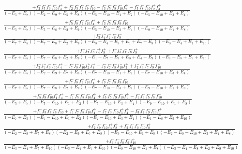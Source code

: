 \documentclass{article}
\begin{document}
\[\begin{array}{rcl}
\frac{+f_{2}^{-}f_{5}^{-}f_{9}^{-}f_{10}^{-}f_{4}^{+}+f_{2}^{-}f_{3}^{-}f_{5}^{-}f_{9}^{-}f_{10}^{-}-f_{3}^{-}f_{5}^{-}f_{8}^{-}f_{10}^{-}f_{2}^{+}-f_{5}^{-}f_{8}^{-}f_{10}^{-}f_{2}^{+}f_{4}^{+}}{(-E_{5}+E_{7})(-E_{2}-E_{9}+E_{5}+E_{8})(-E_{5}-E_{10}+E_{1}+E_{2})(-E_{5}-E_{10}+E_{3}+E_{4})}\\
\frac{+f_{5}^{-}f_{8}^{-}f_{9}^{-}f_{10}^{-}f_{4}^{+}+f_{3}^{-}f_{5}^{-}f_{8}^{-}f_{9}^{-}f_{10}^{-}}{(-E_{5}+E_{7})(-E_{5}-E_{8}+E_{2}+E_{9})(-E_{5}-E_{10}+E_{3}+E_{4})(-E_{9}-E_{10}+E_{1}+E_{8})}\\
\frac{+f_{3}^{-}f_{4}^{-}f_{7}^{-}f_{8}^{-}f_{9}^{-}}{(-E_{7}+E_{5})(-E_{7}-E_{8}+E_{2}+E_{9})(-E_{3}-E_{4}-E_{9}+E_{1}+E_{7}+E_{8})(-E_{3}-E_{4}+E_{7}+E_{10})}\\
\frac{+f_{1}^{-}f_{7}^{-}f_{8}^{-}f_{4}^{+}f_{9}^{+}+f_{1}^{-}f_{3}^{-}f_{7}^{-}f_{8}^{-}f_{9}^{+}}{(-E_{7}+E_{5})(-E_{7}-E_{8}+E_{2}+E_{9})(-E_{1}-E_{7}-E_{8}+E_{3}+E_{4}+E_{9})(-E_{1}-E_{8}+E_{9}+E_{10})}\\
\frac{+f_{2}^{-}f_{7}^{-}f_{9}^{-}f_{10}^{-}f_{4}^{+}-f_{7}^{-}f_{8}^{-}f_{10}^{-}f_{2}^{+}f_{4}^{+}-f_{3}^{-}f_{7}^{-}f_{8}^{-}f_{10}^{-}f_{2}^{+}+f_{2}^{-}f_{3}^{-}f_{7}^{-}f_{9}^{-}f_{10}^{-}}{(-E_{7}+E_{5})(-E_{2}-E_{9}+E_{7}+E_{8})(-E_{7}-E_{10}+E_{1}+E_{2})(-E_{7}-E_{10}+E_{3}+E_{4})}\\
\frac{+f_{7}^{-}f_{8}^{-}f_{9}^{-}f_{10}^{-}f_{4}^{+}+f_{3}^{-}f_{7}^{-}f_{8}^{-}f_{9}^{-}f_{10}^{-}}{(-E_{7}+E_{5})(-E_{7}-E_{8}+E_{2}+E_{9})(-E_{7}-E_{10}+E_{3}+E_{4})(-E_{9}-E_{10}+E_{1}+E_{8})}\\
\frac{+f_{5}^{-}f_{9}^{-}f_{10}^{-}f_{1}^{+}f_{4}^{+}-f_{1}^{-}f_{5}^{-}f_{8}^{-}f_{10}^{-}f_{4}^{+}+f_{3}^{-}f_{5}^{-}f_{9}^{-}f_{10}^{-}f_{1}^{+}-f_{1}^{-}f_{3}^{-}f_{5}^{-}f_{8}^{-}f_{10}^{-}}{(-E_{5}+E_{7})(-E_{5}-E_{10}+E_{1}+E_{2})(-E_{5}-E_{10}+E_{3}+E_{4})(-E_{9}-E_{10}+E_{1}+E_{8})}\\
\frac{+f_{1}^{-}f_{3}^{-}f_{7}^{-}f_{8}^{-}f_{10}^{-}+f_{1}^{-}f_{7}^{-}f_{8}^{-}f_{10}^{-}f_{4}^{+}-f_{7}^{-}f_{9}^{-}f_{10}^{-}f_{1}^{+}f_{4}^{+}-f_{3}^{-}f_{7}^{-}f_{9}^{-}f_{10}^{-}f_{1}^{+}}{(-E_{7}+E_{5})(-E_{7}-E_{10}+E_{1}+E_{2})(-E_{7}-E_{10}+E_{3}+E_{4})(-E_{1}-E_{8}+E_{9}+E_{10})}\\
\frac{+f_{2}^{-}f_{9}^{-}f_{10}^{-}f_{4}^{+}f_{8}^{+}+f_{2}^{-}f_{3}^{-}f_{9}^{-}f_{10}^{-}f_{8}^{+}}{(-E_{2}-E_{9}+E_{5}+E_{8})(-E_{2}-E_{9}+E_{7}+E_{8})(-E_{9}-E_{10}+E_{1}+E_{8})(-E_{2}-E_{9}-E_{10}+E_{3}+E_{4}+E_{8})}\\
\frac{+f_{3}^{-}f_{4}^{-}f_{8}^{-}f_{9}^{-}f_{10}^{+}}{(-E_{3}-E_{4}+E_{5}+E_{10})(-E_{3}-E_{4}+E_{7}+E_{10})(-E_{9}-E_{10}+E_{1}+E_{8})(-E_{3}-E_{4}-E_{8}+E_{2}+E_{9}+E_{10})}\\

\end{array}\]
\end{document}
